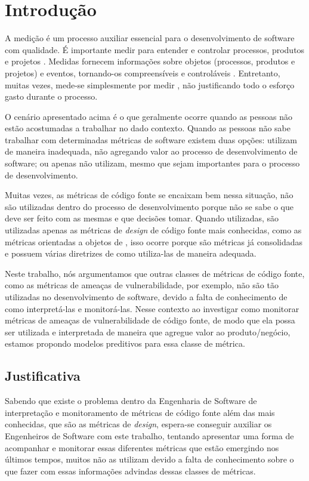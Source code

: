 \chapter{Introdução} \label{cap:introducao}

A medição é um processo auxiliar essencial para o desenvolvimento de software
com qualidade. É importante medir para entender e controlar processos, produtos 
e projetos \cite{ministerio_processo2012}. Medidas fornecem informações sobre 
objetos (processos, produtos e projetos) e eventos, tornando-os compreensíveis 
e controláveis \cite{fenton&pfleenger98}. Entretanto, muitas vezes, mede-se
simplesmente por medir \cite{ministerio_processo2012}, não justificando todo o 
esforço gasto durante o processo.

O cenário apresentado acima é o que geralmente ocorre quando as pessoas não estão
acostumadas a trabalhar no dado contexto. Quando as pessoas não sabe trabalhar
com determinadas métricas de software existem duas opções: utilizam de maneira
inadequada, não agregando valor ao processo de desenvolvimento de software; ou
apenas não utilizam, mesmo que sejam importantes para o processo de
desenvolvimento.

Muitas vezes, as métricas de código fonte se encaixam bem nessa situação, não
são utilizadas dentro do processo de desenvolvimento porque não se sabe o que
deve ser feito com as mesmas e que decisões tomar. Quando utilizadas, são
utilizadas apenas as métricas de \textit{design} de código fonte mais
conhecidas, como as métricas orientadas a objetos de
, isso ocorre porque são métricas já
consolidadas e possuem várias diretrizes de como utiliza-las de maneira
adequada. 

Neste trabalho, nós argumentamos que outras classes de métricas de código fonte,
como as métricas de ameaças de vulnerabilidade, por exemplo, não são tão
utilizadas no desenvolvimento de software, devido a falta de conhecimento de
como interpretá-las e monitorá-las. Nesse contexto ao investigar como monitorar
métricas de ameaças de vulnerabilidade de código fonte, de modo que ela possa
ser utilizada e interpretada de maneira que agregue valor ao produto/negócio,
estamos propondo modelos preditivos para essa classe de métrica.

\section{Justificativa}

Sabendo que existe o problema dentro da Engenharia de Software de interpretação
e monitoramento de métricas de código fonte além das mais conhecidas, que são 
as métricas de \textit{design}, espera-se conseguir auxiliar os 
Engenheiros de Software com este trabalho, tentando apresentar uma forma de
acompanhar e monitorar essas diferentes métricas que estão emergindo
nos últimos tempos, muitos não as utilizam devido a falta de conhecimento sobre
o que fazer com essas informações advindas dessas classes de métricas.

